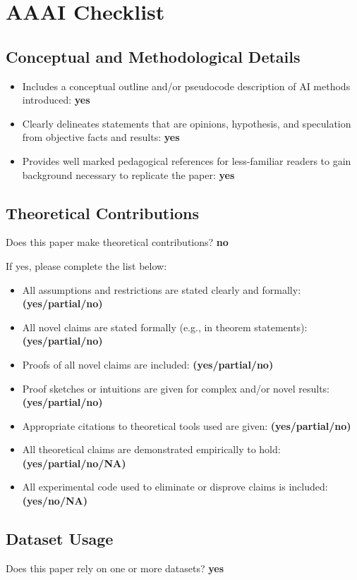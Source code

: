 \clearpage
\section*{AAAI Checklist}
\subsection*{Conceptual and Methodological Details}
\begin{itemize}
    \item[] Includes a conceptual outline and/or pseudocode description of AI methods introduced: \textbf{yes}
    \item[] Clearly delineates statements that are opinions, hypothesis, and speculation from objective facts and results: \textbf{yes}
    \item[] Provides well marked pedagogical references for less-familiar readers to gain background necessary to replicate the paper: \textbf{yes}
\end{itemize}

\subsection*{Theoretical Contributions}
Does this paper make theoretical contributions? \textbf{no}

If yes, please complete the list below:
\begin{itemize}
    \item[] All assumptions and restrictions are stated clearly and formally: \textbf{(yes/partial/no)}
    \item[] All novel claims are stated formally (e.g., in theorem statements): \textbf{(yes/partial/no)}
    \item[] Proofs of all novel claims are included: \textbf{(yes/partial/no)}
    \item[] Proof sketches or intuitions are given for complex and/or novel results: \textbf{(yes/partial/no)}
    \item[] Appropriate citations to theoretical tools used are given: \textbf{(yes/partial/no)}
    \item[] All theoretical claims are demonstrated empirically to hold: \textbf{(yes/partial/no/NA)}
    \item[] All experimental code used to eliminate or disprove claims is included: \textbf{(yes/no/NA)}
\end{itemize}

\subsection*{Dataset Usage}
Does this paper rely on one or more datasets? \textbf{yes}


